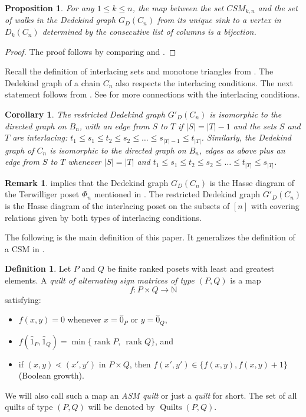 \documentclass[12pt]{amsart}
\newcommand{\N}{{\mathbb N}}
\numberwithin{equation}{section}
\newtheorem{prop}[theorem]{Proposition}
\newtheorem{cor}[theorem]{Corollary}
\theoremstyle{definition}
\newtheorem{defin}[theorem]{Definition}
\newtheorem{remark}[theorem]{Remark}
\newcommand{\longto}{\longrightarrow}
\newcommand{\quilt}{\operatorname{Quilts}}
\newcommand{\rank}{\operatorname{rank}}
\begin{document}
\begin{prop}\label{prop:Dedekind.walks}
For any $1\leq k\leq n $, the map between the set $CSM_{k,n}$ and the
set of walks in the Dedekind graph $G_{D}(C_{n})$ from its unique sink
to a vertex in $D_{k}(C_{n})$ determined by the consecutive list of
columns is a bijection.
\end{prop}

\begin{proof}
The proof follows by comparing  and
.
\end{proof}

Recall the definition of interlacing sets and monotone triangles from
.  The Dedekind graph of a chain $C_{n}$ also
respects the interlacing conditions.  The next statement follows from
. See  for more
connections with the interlacing conditions.


\begin{cor}\label{rem:interlacing}
The restricted Dedekind graph $G'_{D}(C_{n})$ is isomorphic to the
directed graph on $B_n$, with an edge from $S$ to $T$ if $|S| = |T| -
1$ and the sets $S$ and $T$ are interlacing: $t_1 \leq s_1 \leq t_2
\leq s_2 \leq \ldots \leq s_{|T|-1} \leq t_{|T|}$. Similarly, the
Dedekind graph of $C_n$ is isomorphic to the directed graph on $B_n$,
edges as above plus an edge from $S$ to $T$ whenever $|S| = |T|$ and
$t_1 \leq s_1 \leq t_2 \leq s_2 \leq \ldots \leq t_{|T|} \leq
s_{|T|}$.
\end{cor}

\begin{remark}\label{rem:hasse.interlacing}
 implies that the Dedekind graph $G_{D}(C_{n})$
is the Hasse diagram of the Terwilliger poset $\Phi_{n}$ mentioned in
.  The restricted Dedekind graph
$G'_{D}(C_{n})$ is the Hasse diagram of the interlacing poset on the
subsets of $[n]$ with covering relations given by both types of
interlacing conditions.
\end{remark}




The following is the main definition of this paper.  It generalizes
the definition of a CSM in .

\begin{defin} \label{def:quilt}
 Let $P$ and $Q$ be finite ranked posets with least and greatest
elements. A \emph{quilt of alternating sign matrices of type $(P,Q)$}
is a map $$f \colon P \times Q \longto \N$$ satisfying:
\begin{itemize}
 \item $f(x,y) = 0$ whenever $x = \hat 0_P$ or $y = \hat 0_Q$,
 \item $f(\hat 1_P, \hat 1_Q) = \min\{\rank P,\ \rank Q\}$, and
 \item if $(x,y) \lessdot (x',y')$ in $P \times Q$, then $f(x',y') \in
 \{f(x,y),f(x,y)+1\}$ (Boolean growth).
\end{itemize}
We will also call such a map an \emph{ASM quilt} or just a
\emph{quilt} for short. The set of all quilts of type $(P,Q)$ will be denoted by $\quilt(P,Q)$.
\end{defin}
\end{document}
